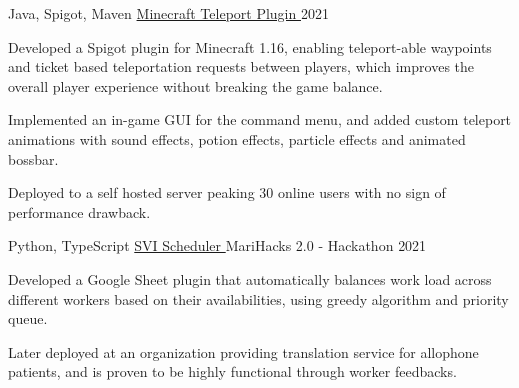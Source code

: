 \begin{cventries}
  \cventry
    {Java, Spigot, Maven} %
    {\href{https://github.com/shiqui/Teleport-Plugin}{Minecraft Teleport Plugin {\faLink}}} %
    {} %
    {2021} %
    {
      \begin{cvitems} %
        \item {Developed a Spigot plugin for Minecraft 1.16, enabling teleport-able waypoints and ticket based teleportation requests between players, which improves the overall player experience without breaking the game balance.}
        \item {Implemented an in-game GUI for the command menu, and added custom teleport animations with sound effects, potion effects, particle effects and animated bossbar.}
        \item {Deployed to a self hosted server peaking 30 online users with no sign of performance drawback.}
      \end{cvitems}
    }

  \cventry
    {Python, TypeScript} %
    {\href{https://devpost.com/software/svi-scheduler}{SVI Scheduler {\faLink}}} %
    {MariHacks 2.0 - Hackathon} %
    {2021} %
    {
      \begin{cvitems} %
        \item {Developed a Google Sheet plugin that automatically balances work load across different workers based on their availabilities, using greedy algorithm and priority queue.}
        \item {Later deployed at an organization providing translation service for allophone patients, and is proven to be highly functional through worker feedbacks.}
      \end{cvitems}
    }

\end{cventries}
